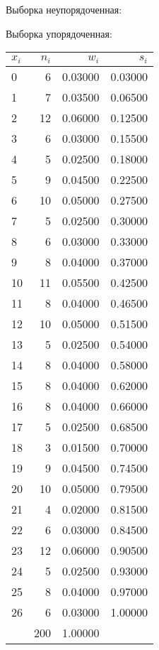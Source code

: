 Выборка неупорядоченная:\newline

\newpage
Выборка упорядоченная:\newline

\newpage



\begin{center}
\begin{tabular}{| l | r | r | r |}
\hline
$x_i$ & $n_i$ & $w_i$ & $s_i$ \\\hline
0 & 6 & 0.03000 & 0.03000 \\\hline
1 & 7 & 0.03500 & 0.06500 \\\hline
2 & 12 & 0.06000 & 0.12500 \\\hline
3 & 6 & 0.03000 & 0.15500 \\\hline
4 & 5 & 0.02500 & 0.18000 \\\hline
5 & 9 & 0.04500 & 0.22500 \\\hline
6 & 10 & 0.05000 & 0.27500 \\\hline
7 & 5 & 0.02500 & 0.30000 \\\hline
8 & 6 & 0.03000 & 0.33000 \\\hline
9 & 8 & 0.04000 & 0.37000 \\\hline
10 & 11 & 0.05500 & 0.42500 \\\hline
11 & 8 & 0.04000 & 0.46500 \\\hline
12 & 10 & 0.05000 & 0.51500 \\\hline
13 & 5 & 0.02500 & 0.54000 \\\hline
14 & 8 & 0.04000 & 0.58000 \\\hline
15 & 8 & 0.04000 & 0.62000 \\\hline
16 & 8 & 0.04000 & 0.66000 \\\hline
17 & 5 & 0.02500 & 0.68500 \\\hline
18 & 3 & 0.01500 & 0.70000 \\\hline
19 & 9 & 0.04500 & 0.74500 \\\hline
20 & 10 & 0.05000 & 0.79500 \\\hline
21 & 4 & 0.02000 & 0.81500 \\\hline
22 & 6 & 0.03000 & 0.84500 \\\hline
23 & 12 & 0.06000 & 0.90500 \\\hline
24 & 5 & 0.02500 & 0.93000 \\\hline
25 & 8 & 0.04000 & 0.97000 \\\hline
26 & 6 & 0.03000 & 1.00000 \\\hline
   & 200 & 1.00000 &   \\\hline
\end{tabular}
\end{center}
